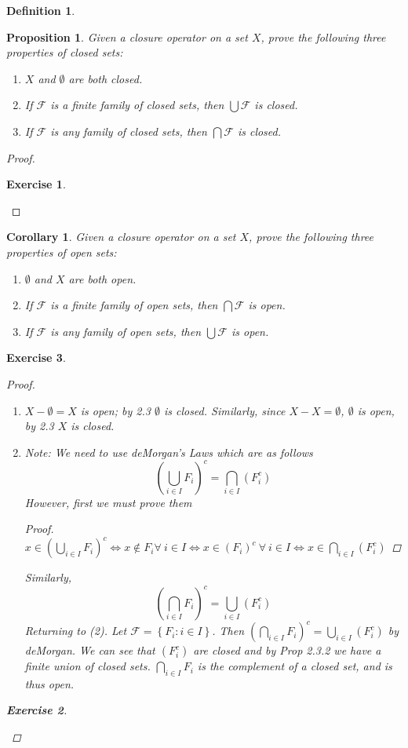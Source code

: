 \documentclass[12pt]{amsart}
\newtheorem{corollary}[theorem]{Corollary}
\newtheorem{proposition}[theorem]{Proposition}
\newtheorem{exercise}{Exercise}[section]
\theoremstyle{definition}
\newtheorem{definition}[theorem]{Definition}
\theoremstyle{remark}
\newcommand{\0}{\emptyset}
\newcommand{\F}{\mathcal F}
\begin{document}
\begin{definition}
\begin{proposition}
Given a closure operator on a set $X$, prove the following three properties of closed sets:
\begin{enumerate}
\item $X$ and $\0$ are both closed.
\item If $\F$ is a finite family of closed sets, then $\bigcup \F$ is closed.
\item If $\F$ is any family of closed sets, then $\bigcap \F$ is closed.
\end{enumerate}
\end{proposition}
\begin{proof}
\begin{exercise}\end{exercise}
\end{proof}

\begin{corollary}
Given a closure operator on a set $X$, prove the following three properties of open sets:
\begin{enumerate}
\item $\0$ and $X$ are both open.
\item If $\F$ is a finite family of open sets, then $\bigcap \F$ is open.
\item If $\F$ is any family of open sets, then $\bigcup \F$ is open.
\end{enumerate}
\end{corollary}
\begin{exercise} 
\begin{proof}
	\begin{enumerate}
		\item $X- \0 = X$ is open; by 2.3 $\0$ is closed. Similarly, since $X-X=\0$, $\0$ is open, by 2.3 $X$ is closed.
		\item Note: We need to use deMorgan's Laws which are as follows
		$$\left(\bigcup_{i \in I}F_i\right)^c = \bigcap_{i \in I}\left(F_i^c\right)$$
		However, first we must prove them
		\begin{proof}
			$x \in \left(\bigcup_{i \in I}F_i\right)^c \iff x \not\in F_i \forall\: i \in I \iff x \in \left(F_i\right)^c \:\forall\: i \in I \iff x \in \bigcap_{i \in I}\left(F_i^c\right)$
		\end{proof}
		Similarly,
		$$\left(\bigcap_{i \in I}F_i\right)^c = \bigcup_{i \in I}\left(F_i^c\right)$$
		Returning to (2). Let $\F = \left\{ F_i:i \in I \right\}$. Then $\left( \bigcap_{i \in I}F_i \right)^c = \bigcup_{i \in I}\left(F_i^c\right)$ by deMorgan. We can see that $\left( F_i^c \right)$ are closed and by Prop 2.3.2 we have a finite union of closed sets. $\bigcap_{i \in I}F_i$ is the complement of a closed set, and is thus open.
	\end{enumerate}
\begin{exercise}\end{exercise}
\end{proof}


\end{exercise}
\end{definition}
\end{document}
